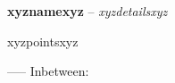\noindent\textbf{xyznamexyz} -- \textit{xyzdetailsxyz}
\begin{itemize}
    xyzpointsxyz
\end{itemize}
-----
Inbetween: \vspace{2pt}
